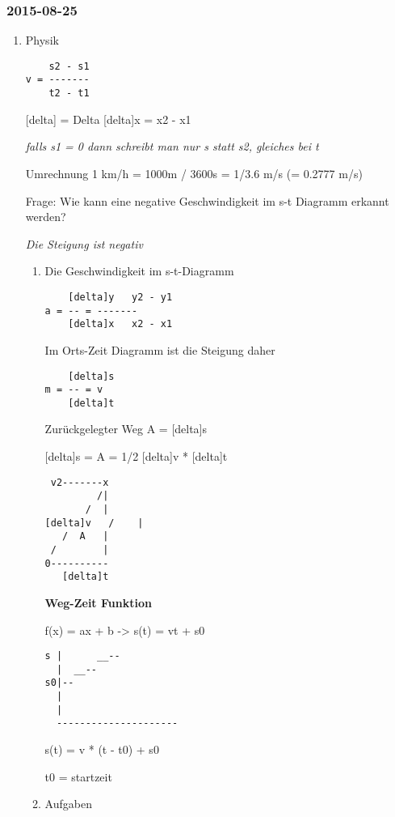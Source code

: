 \documentclass[11pt]{article}
\begin{document}
\subsubsection{2015-08-25}
\label{sec-1-2-2}
\begin{enumerate}
\item Physik
\label{sec-1-2-2-1}

\begin{verbatim}
    s2 - s1
v = -------
    t2 - t1
\end{verbatim}

[delta] = Delta
[delta]x = x2 - x1

\emph{falls s1 = 0 dann schreibt man nur s statt s2, gleiches bei t}


Umrechnung 1 km/h = 1000m / 3600s = 1/3.6 m/s (= 0.2777 m/s)


Frage: Wie kann eine negative Geschwindigkeit im s-t Diagramm erkannt werden?

\emph{Die Steigung ist negativ} 


\begin{enumerate}
\item Die Geschwindigkeit im s-t-Diagramm
\label{sec-1-2-2-1-1}


\begin{verbatim}
    [delta]y   y2 - y1
a = -- = -------
    [delta]x   x2 - x1
\end{verbatim}

Im Orts-Zeit Diagramm ist die Steigung daher

\begin{verbatim}
    [delta]s
m = -- = v
    [delta]t
\end{verbatim}

Zurückgelegter Weg
A = [delta]s


[delta]s = A = 1/2 [delta]v * [delta]t
\begin{verbatim}
 v2-------x
         /|
       /  |
[delta]v   /    |
   /  A   |
 /        |
0----------
   [delta]t
\end{verbatim}


\textbf{Weg-Zeit Funktion}

f(x) = ax + b -> s(t) = vt + s0

\begin{verbatim}
s |      __--
  |  __--
s0|--
  |
  |
  ---------------------
\end{verbatim}
s(t) = v * (t - t0) + s0

t0 = startzeit

\item Aufgaben
\label{sec-1-2-2-1-2}


\end{enumerate}
\end{enumerate}
\end{document}
